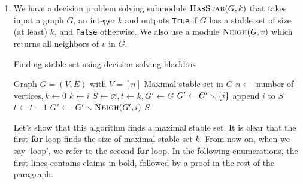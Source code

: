 \begin{enumerate}[leftmargin=*]
\item We have a decision problem solving submodule $\textsc{HasStab}(G,k)$ that takes input a graph $G$, an integer $k$ and outputs \texttt{True} if $G$ has a stable set of size (at least) $k$, and \texttt{False} otherwise. We also use a module $\textsc{Neigh}(G,v)$ which returns all neighbors of $v$ in $G$. 

\begin{algorithm}
\caption{Finding stable set using decision solving blackbox}\label{alg:cap}
\begin{algorithmic}
\Require Graph $G = (V,E)$ with $V=[n]$
\Ensure Maximal stable set in $G$
\State $n \gets$ number of vertices$, k\gets 0$
	\State $k \gets i$
\EndIf
\EndFor
\State $S \gets \varnothing, t \gets k, G' \gets G$ 
\State $G' \gets G'\smallsetminus \left\{i\right\}$
{}
	\State append $i$ to $S$
	\State $t \gets t-1$
	\State $G' \gets$ $G'\smallsetminus \textsc{Neigh}(G',i)$
\EndIf
\EndFor
\State \Return $S$
\EndProcedure
\end{algorithmic}
\end{algorithm}

Let's show that this algorithm finds a maximal stable set. It is clear that the first \textbf{for} loop finds the size of maximal stable set $k$. From now on, when we say `loop', we refer to the second \textbf{for} loop. In the following enumerations, the first lines contains claims in bold, followed by a proof in the rest of the paragraph.


\end{enumerate}
